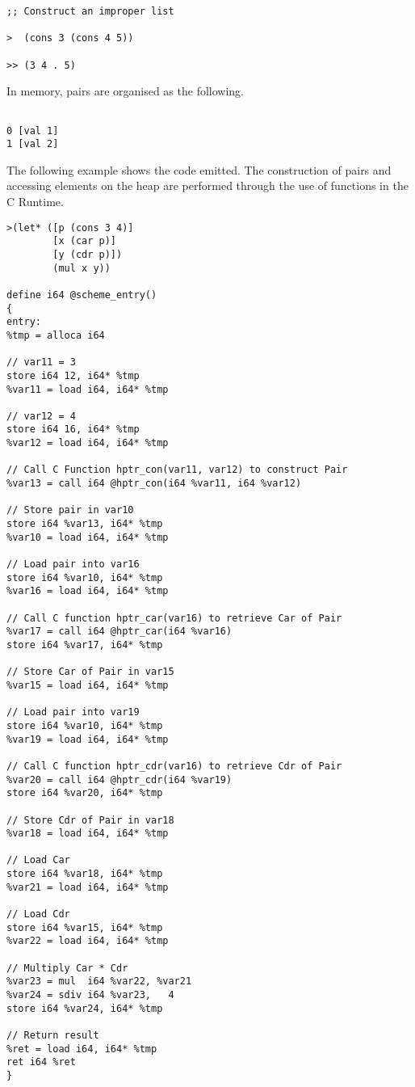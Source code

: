 \documentclass{article}
\begin{document}
\begin{verbatim}
;; Construct an improper list

>  (cons 3 (cons 4 5))

>> (3 4 . 5)
\end{verbatim}

In memory, pairs are organised as the following. 

\begin{verbatim}

0 [val 1]
1 [val 2]

\end{verbatim}

The following example shows the code emitted. The construction of pairs and accessing elements on the heap are performed through the use of functions in the C Runtime.

\begingroup
    \fontsize{8pt}{5pt}\selectfont
\begin{verbatim}
>(let* ([p (cons 3 4)]
        [x (car p)]
        [y (cdr p)])
        (mul x y))

define i64 @scheme_entry()
{
entry: 
%tmp = alloca i64

// var11 = 3
store i64 12, i64* %tmp
%var11 = load i64, i64* %tmp     

// var12 = 4
store i64 16, i64* %tmp
%var12 = load i64, i64* %tmp

// Call C Function hptr_con(var11, var12) to construct Pair
%var13 = call i64 @hptr_con(i64 %var11, i64 %var12) 

// Store pair in var10
store i64 %var13, i64* %tmp
%var10 = load i64, i64* %tmp

// Load pair into var16
store i64 %var10, i64* %tmp
%var16 = load i64, i64* %tmp

// Call C function hptr_car(var16) to retrieve Car of Pair
%var17 = call i64 @hptr_car(i64 %var16)
store i64 %var17, i64* %tmp

// Store Car of Pair in var15
%var15 = load i64, i64* %tmp

// Load pair into var19
store i64 %var10, i64* %tmp
%var19 = load i64, i64* %tmp

// Call C function hptr_cdr(var16) to retrieve Cdr of Pair
%var20 = call i64 @hptr_cdr(i64 %var19)
store i64 %var20, i64* %tmp

// Store Cdr of Pair in var18
%var18 = load i64, i64* %tmp

// Load Car
store i64 %var18, i64* %tmp
%var21 = load i64, i64* %tmp

// Load Cdr
store i64 %var15, i64* %tmp
%var22 = load i64, i64* %tmp

// Multiply Car * Cdr 
%var23 = mul  i64 %var22, %var21
%var24 = sdiv i64 %var23,   4
store i64 %var24, i64* %tmp

// Return result
%ret = load i64, i64* %tmp
ret i64 %ret
}
\end{verbatim}
\endgroup
\end{document}
